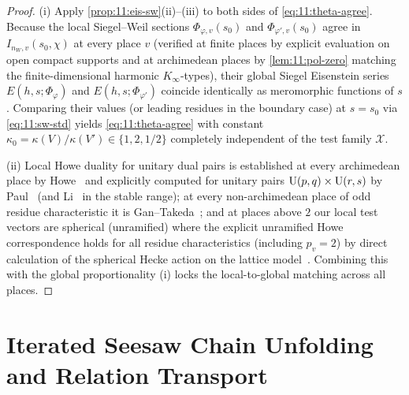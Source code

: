 \begin{proof}
(i) Apply \cref{prop:11:eis-sw}(ii)--(iii) to both sides of \eqref{eq:11:theta-agree}. Because the local Siegel--Weil sections $\Phi_{\varphi, v}(s_0)$ and $\Phi_{\varphi', v}(s_0)$ agree in $I_{n_W, v}(s_0, \chi)$ at every place $v$ (verified at finite places by explicit evaluation on open compact supports and at archimedean places by \cref{lem:11:pol-zero} matching the finite-dimensional harmonic $K_\infty$-types), their global Siegel Eisenstein series $E(h, s; \Phi_\varphi)$ and $E(h, s; \Phi_{\varphi'})$ coincide identically as meromorphic functions of $s$. Comparing their values (or leading residues in the boundary case) at $s = s_0$ via \eqref{eq:11:sw-std} yields \eqref{eq:11:theta-agree} with constant $\kappa_0 = \kappa(V)/\kappa(V') \in \{1, 2, 1/2\}$ completely independent of the test family $\mathcal{X}$.

(ii) Local Howe duality for unitary dual pairs is established at every archimedean place by Howe~\cite{Howe1989} and explicitly computed for unitary pairs $\mathrm{U}(p, q) \times \mathrm{U}(r, s)$ by Paul~\cite{Paul1998} (and Li~\cite{Li1992} in the stable range); at every non-archimedean place of odd residue characteristic it is Gan--Takeda~\cite[Theorem~1.1]{GanTakeda2016}; and at places above $2$ our local test vectors are spherical (unramified) where the explicit unramified Howe correspondence holds for all residue characteristics (including $p_v = 2$) by direct calculation of the spherical Hecke action on the lattice model~\cite{Kudla1994,PSR1987}. Combining this with the global proportionality (i) locks the local-to-global matching across all places.
\end{proof}

\section{Iterated Seesaw Chain Unfolding and Relation Transport}
\label{sec:11:seesaw-chain}

